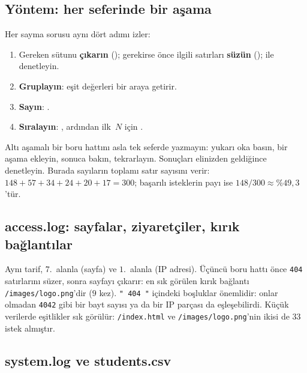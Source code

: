 \subsection{Yöntem: her seferinde bir aşama}




Her sayma sorusu aynı dört adımı izler:
\begin{enumerate}[leftmargin=1.4em]
  \item Gereken sütunu \textbf{çıkarın} (); gerekirse önce ilgili satırları \textbf{süzün} ();  ile denetleyin.
  \item \textbf{Gruplayın}:  eşit değerleri bir araya getirir.
  \item \textbf{Sayın}: .
  \item \textbf{Sıralayın}: , ardından ilk~$N$ için .
\end{enumerate}
Altı aşamalı bir boru hattını asla tek seferde yazmayın: yukarı oka basın, bir aşama ekleyin, sonuca bakın, tekrarlayın. Sonuçları elinizden geldiğince denetleyin. Burada sayıların toplamı satır sayısını verir: $148 + 57 + 34 + 24 + 20 + 17 = 300$; başarılı isteklerin payı ise $148/300 \approx \%49{,}3$'tür.

\subsection{access.log: sayfalar, ziyaretçiler, kırık bağlantılar}



Aynı tarif, $7$.~alanla (sayfa) ve $1$.~alanla (IP adresi). Üçüncü boru hattı önce \texttt{404} satırlarını süzer, sonra sayfayı çıkarır: en sık görülen kırık bağlantı \texttt{/images/logo.png}'dir ($9$ kez). \texttt{" 404 "} içindeki boşluklar önemlidir: onlar olmadan \texttt{4042} gibi bir bayt sayısı ya da bir IP parçası da eşleşebilirdi. Küçük verilerde eşitlikler sık görülür: \texttt{/index.html} ve \texttt{/images/logo.png}'nin ikisi de $33$ istek almıştır.

\subsection{system.log ve students.csv}



